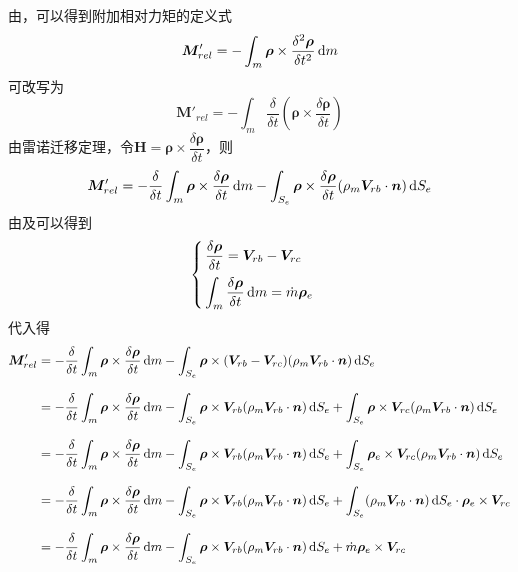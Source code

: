 由\peref[绕质心的运动方程]，可以得到附加相对力矩的定义式
\begin{equation}
	\bm{M}'_{rel} = - \int_m \bm{\rho} \times \dfrac{\delta^2 \bm{\rho}}{\delta t^2}\, {\rm{d}} m
\end{equation}
可改写为
\begin{equation}
	\bm{M}'_{rel} = - \int_m \dfrac{\delta }{\delta t} \left(\bm{\rho} \times \dfrac{\delta \bm{\rho}}{\delta t}\right)
\end{equation}
由雷诺迁移定理，令$\bm{H} = \bm{\rho} \times \dfrac{\delta \bm{\rho}}{\delta t}$，则
\begin{equation}
	\bm{M}'_{rel} = - \dfrac{\delta }{\delta t} \int_m \bm{\rho} \times \dfrac{\delta \bm{\rho}}{\delta t} \, {\rm{d}} m  - \int_{S_e}  \bm{\rho} \times \dfrac{\delta \bm{\rho}}{\delta t}(\rho_m \bm{V}_{rb}\cdot \bm{n}) \, {\rm{d}} S_e
\end{equation}
由\peref[dp]及\peref[质量秒耗量]可以得到
\begin{equation*}
	\begin{cases}
		\, \dfrac{\delta \bm{\rho}}{\delta t} = \bm{V}_{rb} - \bm{V}_{rc} \\[0.8em]
		\, \displaystyle \int_m \dfrac{\delta \bm{\rho}}{\delta t} \, {\rm{d}} m = \dot{m}\bm{\rho}_e
	\end{cases}
\end{equation*}
代入得
\begin{align*}
	\bm{M}'_{rel} & = - \dfrac{\delta }{\delta t} \int_m \bm{\rho} \times \dfrac{\delta \bm{\rho}}{\delta t} \, {\rm{d}} m  - \int_{S_e}  \bm{\rho} \times (\bm{V}_{rb} - \bm{V}_{rc})(\rho_m \bm{V}_{rb}\cdot \bm{n}) \, {\rm{d}} S_e\\[0.8em]
	& =  - \dfrac{\delta }{\delta t} \int_m \bm{\rho} \times \dfrac{\delta \bm{\rho}}{\delta t} \, {\rm{d}} m  - \int_{S_e}  \bm{\rho} \times \bm{V}_{rb} (\rho_m \bm{V}_{rb}\cdot \bm{n}) \, {\rm{d}} S_e + \int_{S_e}  \bm{\rho} \times \bm{V}_{rc}(\rho_m \bm{V}_{rb}\cdot \bm{n}) \, {\rm{d}} S_e \\[0.8em]
	& = - \dfrac{\delta }{\delta t} \int_m \bm{\rho} \times \dfrac{\delta \bm{\rho}}{\delta t} \, {\rm{d}} m  - \int_{S_e}  \bm{\rho} \times \bm{V}_{rb} (\rho_m \bm{V}_{rb}\cdot \bm{n}) \, {\rm{d}} S_e + \int_{S_e}  \bm{\rho}_e \times \bm{V}_{rc}(\rho_m \bm{V}_{rb}\cdot \bm{n}) \, {\rm{d}} S_e \\[0.8em]
	& = - \dfrac{\delta }{\delta t} \int_m \bm{\rho} \times \dfrac{\delta \bm{\rho}}{\delta t} \, {\rm{d}} m  - \int_{S_e}  \bm{\rho} \times \bm{V}_{rb} (\rho_m \bm{V}_{rb}\cdot \bm{n}) \, {\rm{d}} S_e + \int_{S_e} (\rho_m \bm{V}_{rb}\cdot \bm{n}) \, {\rm{d}} S_e \cdot  \bm{\rho}_e \times \bm{V}_{rc} \\[0.8em]
	& = - \dfrac{\delta }{\delta t} \int_m \bm{\rho} \times \dfrac{\delta \bm{\rho}}{\delta t} \, {\rm{d}} m  - \int_{S_e}  \bm{\rho} \times \bm{V}_{rb} (\rho_m \bm{V}_{rb}\cdot \bm{n}) \, {\rm{d}} S_e +\dot{m} \bm{\rho}_e \times \bm{V}_{rc}
\end{align*}
